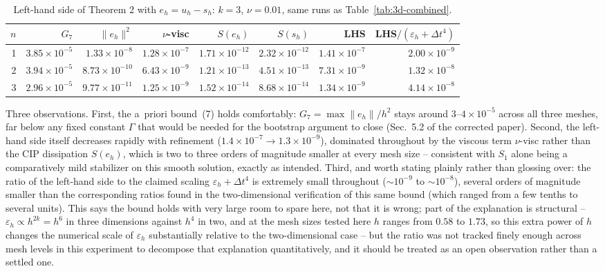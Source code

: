 \documentclass[11pt]{article}
\newcommand{\eps}{\varepsilon}
\begin{document}
\begin{table}[h]\centering
\caption{Left-hand side of Theorem 2 with $e_h=u_h-s_h$: $k=3$, $\nu=0.01$, same runs as
Table~\ref{tab:3d-combined}.}
\label{tab:3d-thm2}
\begin{tabular}{rrrrrrrr}
\toprule
$n$ & $G_7$ & $\|e_h\|^2$ & $\nu$-visc & $S(e_h)$ & $S(s_h)$ & LHS & LHS$/(\eps_h+\Delta t^4)$ \\
\midrule
1 & $3.85\times10^{-5}$ & $1.33\times10^{-8}$  & $1.28\times10^{-7}$ & $1.71\times10^{-12}$ & $2.32\times10^{-12}$ & $1.41\times10^{-7}$ & $2.00\times10^{-9}$ \\
2 & $3.94\times10^{-5}$ & $8.73\times10^{-10}$ & $6.43\times10^{-9}$ & $1.21\times10^{-13}$ & $4.51\times10^{-13}$ & $7.31\times10^{-9}$ & $1.32\times10^{-8}$ \\
3 & $2.96\times10^{-5}$ & $9.77\times10^{-11}$ & $1.25\times10^{-9}$ & $1.52\times10^{-14}$ & $8.68\times10^{-14}$ & $1.34\times10^{-9}$ & $4.14\times10^{-8}$ \\
\bottomrule
\end{tabular}
\end{table}

Three observations. First, the a~priori bound~(7) holds comfortably: $G_7=\max\|e_h\|/h^2$
stays around $3$--$4\times10^{-5}$ across all three meshes, far below any fixed constant
$\Gamma$ that would be needed for the bootstrap argument to close (Sec.~5.2 of the
corrected paper). Second, the left-hand side itself decreases rapidly with refinement
($1.4\times10^{-7}\to1.3\times10^{-9}$), dominated throughout by the viscous term
$\nu$-visc rather than the CIP dissipation $S(e_h)$, which is two to three orders of
magnitude smaller at every mesh size -- consistent with $S_1$ alone being a comparatively
mild stabilizer on this smooth solution, exactly as intended. Third, and worth stating
plainly rather than glossing over: the ratio of the left-hand side to the claimed scaling
$\eps_h+\Delta t^4$ is extremely small throughout ($\sim10^{-9}$ to $\sim10^{-8}$), several
orders of magnitude smaller than the corresponding ratios found in the two-dimensional
verification of this same bound (which ranged from a few tenths to several units). This
says the bound holds with very large room to spare here, not that it is wrong; part of
the explanation is structural -- $\eps_h\propto h^{2k}=h^6$ in three dimensions against
$h^{4}$ in two, and at the mesh sizes tested here $h$ ranges from $0.58$ to $1.73$, so this
extra power of $h$ changes the numerical scale of $\eps_h$ substantially relative to the
two-dimensional case -- but the ratio was not tracked finely enough across mesh levels in
this experiment to decompose that explanation quantitatively, and it should be treated as
an open observation rather than a settled one.
\end{document}
